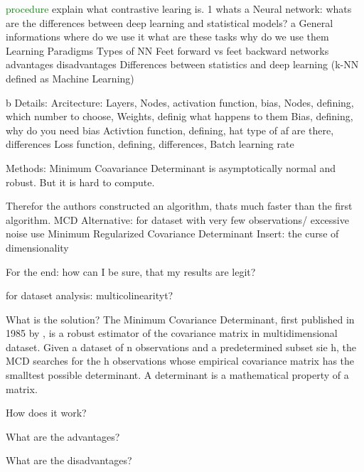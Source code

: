 \textcolor{green}{procedure}
explain what contrastive learing is.
1 whats a Neural network: whats are the differences between deep learning and statistical models?
    a General informations
        where do we use it 
        what are these tasks
        why do we use them
        Learning Paradigms
        Types of NN
        Feet forward vs feet backward networks
        advantages disadvantages 
        Differences between statistics and deep learning (k-NN defined as Machine Learning)

    b Details: 
        Arcitecture: Layers, Nodes, activation function, bias,
        Nodes, defining, which number to choose,
        Weights, definig what happens to them
        Bias, defining, why do you need bias
        Activtion function, defining, hat type of af are there, differences
        Loss function, defining, differences, 
        Batch
        learning rate



Methods: 
Minimum Coavariance Determinant is asymptotically normal and robust. But it is hard to compute.


Therefor the authors constructed an algorithm, thats much faster than the first algorithm.
MCD Alternative: for dataset with very few observations/ excessive noise use Minimum Regularized Covariance Determinant
Insert: the curse of dimensionality

For the end: how can I be sure, that my results are legit?

for dataset analysis: multicolinearityt?



What is the solution?
The Minimum Covariance Determinant, first published in 1985 by , is a robust estimator of the covariance matrix in multidimensional dataset.
Given a dataset of n observations and a predetermined subset sie h, the MCD searches for the h observations whose empirical covariance matrix has the smalltest possible determinant.
A determinant is a mathematical property of a matrix.

How does it work?


What are the advantages?

What are the disadvantages?


